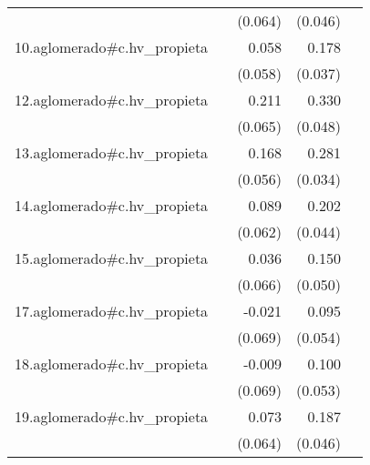 {\begin{longtable}{l*{4}{D{.}{.}{-1}}}
            &                     &     (0.064)         &     (0.046)         &                     \\
\addlinespace
10.aglomerado#c.hv\_propieta&                     &       0.058         &       0.178\sym{***}&                     \\
            &                     &     (0.058)         &     (0.037)         &                     \\
\addlinespace
12.aglomerado#c.hv\_propieta&                     &       0.211\sym{**} &       0.330\sym{***}&                     \\
            &                     &     (0.065)         &     (0.048)         &                     \\
\addlinespace
13.aglomerado#c.hv\_propieta&                     &       0.168\sym{**} &       0.281\sym{***}&                     \\
            &                     &     (0.056)         &     (0.034)         &                     \\
\addlinespace
14.aglomerado#c.hv\_propieta&                     &       0.089         &       0.202\sym{***}&                     \\
            &                     &     (0.062)         &     (0.044)         &                     \\
\addlinespace
15.aglomerado#c.hv\_propieta&                     &       0.036         &       0.150\sym{**} &                     \\
            &                     &     (0.066)         &     (0.050)         &                     \\
\addlinespace
17.aglomerado#c.hv\_propieta&                     &      -0.021         &       0.095         &                     \\
            &                     &     (0.069)         &     (0.054)         &                     \\
\addlinespace
18.aglomerado#c.hv\_propieta&                     &      -0.009         &       0.100         &                     \\
            &                     &     (0.069)         &     (0.053)         &                     \\
\addlinespace
19.aglomerado#c.hv\_propieta&                     &       0.073         &       0.187\sym{***}&                     \\
            &                     &     (0.064)         &     (0.046)         &                     \\

\end{longtable}}

